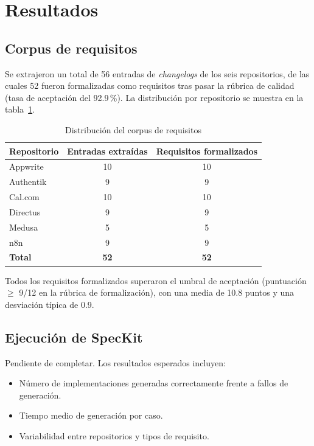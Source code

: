\section{Resultados}
\label{sec:resultados}

\subsection{Corpus de requisitos}

Se extrajeron un total de 56 entradas de \emph{changelogs} de los seis repositorios, de las cuales 52 fueron formalizadas como requisitos tras pasar la r\'ubrica de calidad (tasa de aceptaci\'on del 92.9\,\%). La distribuci\'on por repositorio se muestra en la tabla~\ref{tab:corpus}.

\begin{table}[h]
\centering
\caption{Distribuci\'on del corpus de requisitos}
\label{tab:corpus}
\begin{tabular}{lcc}
\toprule
\textbf{Repositorio} & \textbf{Entradas extra\'idas} & \textbf{Requisitos formalizados} \\
\midrule
Appwrite & 10 & 10 \\
Authentik & 9 & 9 \\
Cal.com & 10 & 10 \\
Directus & 9 & 9 \\
Medusa & 5 & 5 \\
n8n & 9 & 9 \\
\midrule
\textbf{Total} & \textbf{52} & \textbf{52} \\
\bottomrule
\end{tabular}
\end{table}

Todos los requisitos formalizados superaron el umbral de aceptaci\'on (puntuaci\'on $\geq$ 9/12 en la r\'ubrica de formalizaci\'on), con una media de 10.8 puntos y una desviaci\'on t\'ipica de 0.9.

\subsection{Ejecuci\'on de SpecKit}

Pendiente de completar. Los resultados esperados incluyen:

\begin{itemize}
    \item N\'umero de implementaciones generadas correctamente frente a fallos de generaci\'on.
    \item Tiempo medio de generaci\'on por caso.
    \item Variabilidad entre repositorios y tipos de requisito.
\end{itemize}

